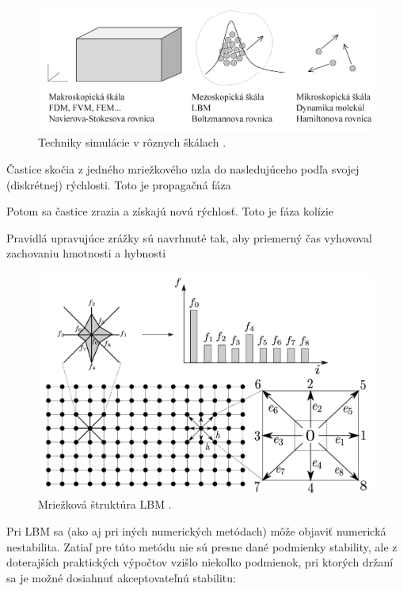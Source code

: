 \documentclass[]{tukediphc}
\begin{document}
\begin{figure}[!ht]
	\centering
	\includegraphics[width=1\textwidth,angle=0]{figures/different-scales.png}
	\caption{Techniky simulácie v rôznych škálach \citep{Mele2013}.}
\end{figure}

Častice skočia z jedného mriežkového uzla do nasledujúceho podľa svojej (diskrétnej) rýchlosti. Toto je propagačná fáza

Potom sa častice zrazia a získajú novú rýchlosť. Toto je fáza kolízie

Pravidlá upravujúce zrážky sú navrhnuté tak, aby priemerný čas vyhovoval zachovaniu hmotnosti a hybnosti

\begin{figure}[!ht]
	\centering
	\includegraphics[width=.7\textwidth,angle=0]{figures/lbm-grid.jpg}
	\caption{Mriežková štruktúra LBM \citep{Soga2020}.}
\end{figure}

Pri LBM sa (ako aj pri iných numerických metódach) môže objaviť numerická nestabilita. Zatiaľ pre túto metódu nie sú presne dané podmienky stability, ale z doterajších praktických výpočtov vzišlo niekoľko podmienok, pri ktorých držaní sa je možné dosiahnuť akceptovateľnú stabilitu:
\end{document}
